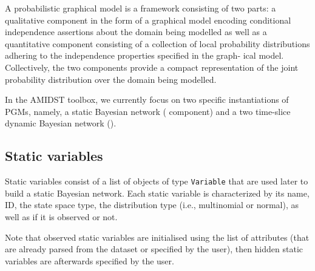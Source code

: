  A probabilistic graphical model is a framework consisting of two parts: a qualitative component in the form of a graphical model encoding conditional independence assertions about the domain being modelled as well as a quantitative component consisting of a collection of local probability distributions adhering to the independence properties specified in the graph- ical model. Collectively, the two components provide a compact representation of the joint probability distribution over the domain being modelled.
 
In the AMIDST toolbox, we currently focus on two specific instantiations of PGMs, namely, a static Bayesian network ( component) and a two time-slice dynamic Bayesian network (). 
 

\subsection{Static variables}

Static variables consist of a list of objects of type \texttt{Variable} that are used later to build a static Bayesian network. Each static variable is characterized by its name, ID, the state space type, the distribution type (i.e., multinomial or normal), as well as if it is observed or not. 

Note that observed static variables are initialised using the list of attributes (that are already parsed from the dataset or specified by the user), then hidden static variables are afterwards specified by the user.

